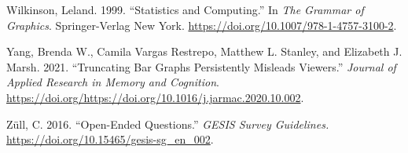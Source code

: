 \documentclass[
  11pt,
]{book}
\begin{document}
\leavevmode\hypertarget{ref-wilkinson2009}{}%
Wilkinson, Leland. 1999. ``Statistics and Computing.'' In \emph{The
Grammar of Graphics}. Springer-Verlag New York.
\url{https://doi.org/10.1007/978-1-4757-3100-2}.

\leavevmode\hypertarget{ref-YANG2021}{}%
Yang, Brenda W., Camila Vargas Restrepo, Matthew L. Stanley, and
Elizabeth J. Marsh. 2021. ``Truncating Bar Graphs Persistently Misleads
Viewers.'' \emph{Journal of Applied Research in Memory and Cognition}.
\url{https://doi.org/https://doi.org/10.1016/j.jarmac.2020.10.002}.

\leavevmode\hypertarget{ref-leibniz}{}%
Züll, C. 2016. ``Open-Ended Questions.'' \emph{GESIS Survey Guidelines.}
\url{https://doi.org/10.15465/gesis-sg_en_002}.

\backmatter
\end{document}
